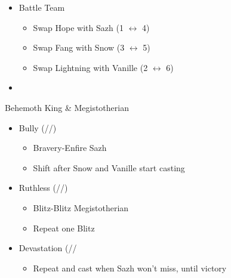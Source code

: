 \documentclass{report}
\begin{document}
\begin{menu}
\begin{itemize}
    \paradigm
    \begin{itemize}
        \item Battle Team
        \begin{itemize}
            \item Swap Hope with Sazh (1 $\leftrightarrow$ 4)
            \item Swap Fang with Snow (3 $\leftrightarrow$ 5)
            \item Swap Lightning with Vanille (2 $\leftrightarrow$ 6)
        \end{itemize}
        \item {}%
{\paradigmline{\com}{\med}{(\com)}}%
{\paradigmline{\com}{(\sab)}{\rav}}%
{\paradigmline{\syn}{\med}{(\com)}}%
{\paradigmline{[\com]}{(\sab)}{\com}}%
{\paradigmline{\textit{\syn}}{\textit{[\sab]}}{\textit{\com}}}%
{\paradigmline{[\com]}{\rav}{\com}}
    \end{itemize}
\end{itemize}
\end{menu}

\renewcommand{\first}{[1] Tireless Charge (\com/\med/\com)}
\renewcommand{\second}{[2] Ruthless (\com/\sab/\rav)}
\renewcommand{\third}{[3] }
\renewcommand{\fourth}{[4] Devastation (\com/\sab/\com}
\renewcommand{\fifth}{[5] Bully (\syn/\sab/\rav)}
\renewcommand{\sixth}{[6] Relentless Assault (\com/\rav/\com)}

\begin{battle}{Behemoth King \& Megistotherian}
\begin{itemize}
    \item \fifth
    \begin{itemize}
        \item Bravery-Enfire Sazh
        \item Shift after Snow and Vanille start casting
    \end{itemize}
    \item \second
    \begin{itemize}
        \item Blitz-Blitz Megistotherian
        \item Repeat one Blitz
    \end{itemize}
    \item \fourth
    \begin{itemize}
        \item Repeat and cast when Sazh won't miss, until victory
    \end{itemize}
\end{itemize}
\end{battle}
\end{document}
